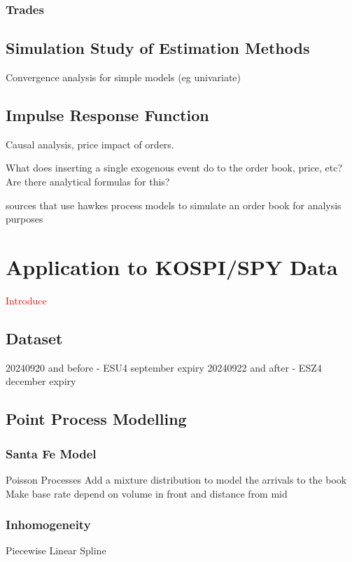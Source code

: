 \documentclass[honours,12pt]{unswthesis}
\numberwithin{equation}{section}
\begin{document}
\subsection{Trades}

\section{Simulation Study of Estimation Methods}
Convergence analysis for simple models (eg univariate)

\section{Impulse Response Function}
Causal analysis, price impact of orders.

What does inserting a single exogenous event do to the order book, price, etc? Are there analytical formulas for this?


\cite{AbergelJedidi} \cite{Toke} sources that use hawkes process models to simulate an order book for analysis purposes


\chapter{Application to KOSPI/SPY Data} %

\textcolor{red}{Introduce}

\section{Dataset}

20240920 and before - ESU4 september expiry
20240922 and after - ESZ4 december expiry

\section{Point Process Modelling}
\subsection{Santa Fe Model}
Poisson Processes
Add a mixture distribution to model the arrivals to the book
Make base rate depend on volume in front and distance from mid
\subsection{Inhomogeneity}

Piecewise Linear Spline
\end{document}
